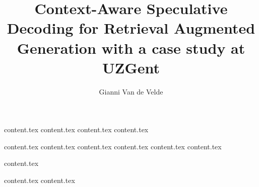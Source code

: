 \documentclass{report}
\title{\LARGE Context-Aware Speculative Decoding for Retrieval Augmented
Generation with a case study at UZGent}
\author{Gianni Van de Velde}
\begin{document}
    

    \newpage
    \newpage
    
    \titleformat{\chapter}{}{}{0em}{\bf\Huge}

    \afterpage{\blankpage}


    {content.tex}
    {content.tex}
    {content.tex}
    {content.tex}
    

    \tableofcontents


    
    \titleformat{\chapter}[display]{\normalfont\bfseries\Huge}{\chaptertitlename\ \thechapter}{1em}{\bf\Huge}

    \newpage

    {content.tex}
    {content.tex}
    {content.tex}
    {content.tex}
    {content.tex}
    {content.tex}

    {content.tex}

    \printbibliography

    \appendix
    {content.tex}
    {content.tex}

    \afterpage{\blankpage}

\end{document}
